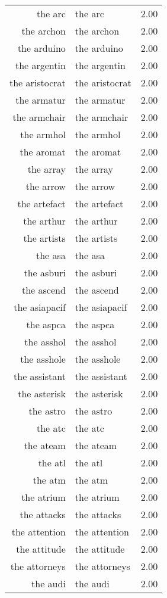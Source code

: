 \begin{table}[ht]
\begin{tabular}{rlr}
  the arc & the arc & 2.00 \\ 
  the archon & the archon & 2.00 \\ 
  the arduino & the arduino & 2.00 \\ 
  the argentin & the argentin & 2.00 \\ 
  the aristocrat & the aristocrat & 2.00 \\ 
  the armatur & the armatur & 2.00 \\ 
  the armchair & the armchair & 2.00 \\ 
  the armhol & the armhol & 2.00 \\ 
  the aromat & the aromat & 2.00 \\ 
  the array & the array & 2.00 \\ 
  the arrow & the arrow & 2.00 \\ 
  the artefact & the artefact & 2.00 \\ 
  the arthur & the arthur & 2.00 \\ 
  the artists & the artists & 2.00 \\ 
  the asa & the asa & 2.00 \\ 
  the asburi & the asburi & 2.00 \\ 
  the ascend & the ascend & 2.00 \\ 
  the asiapacif & the asiapacif & 2.00 \\ 
  the aspca & the aspca & 2.00 \\ 
  the asshol & the asshol & 2.00 \\ 
  the asshole & the asshole & 2.00 \\ 
  the assistant & the assistant & 2.00 \\ 
  the asterisk & the asterisk & 2.00 \\ 
  the astro & the astro & 2.00 \\ 
  the atc & the atc & 2.00 \\ 
  the ateam & the ateam & 2.00 \\ 
  the atl & the atl & 2.00 \\ 
  the atm & the atm & 2.00 \\ 
  the atrium & the atrium & 2.00 \\ 
  the attacks & the attacks & 2.00 \\ 
  the attention & the attention & 2.00 \\ 
  the attitude & the attitude & 2.00 \\ 
  the attorneys & the attorneys & 2.00 \\ 
  the audi & the audi & 2.00 \\ 

\end{tabular}
\end{table}
